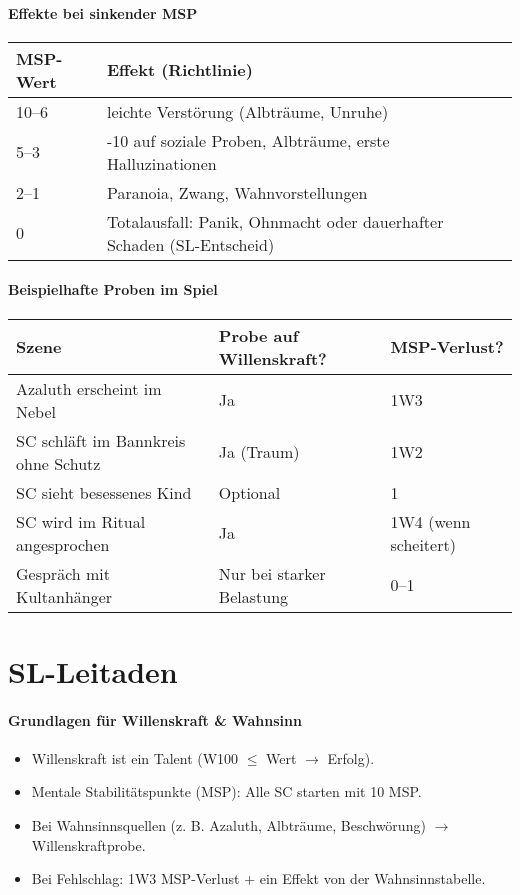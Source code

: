 \paragraph{Effekte bei sinkender MSP}
\begin{center}
\begin{tabular}{ll}
\toprule
\textbf{MSP-Wert} & \textbf{Effekt (Richtlinie)}\\
\midrule 
10–6 & leichte Verstörung (Albträume, Unruhe)\\
\midrule 
5–3 & -10 auf soziale Proben, Albträume, erste Halluzinationen\\
\midrule 
2–1 & Paranoia, Zwang, Wahnvorstellungen\\
\midrule 
0 & Totalausfall: Panik, Ohnmacht oder dauerhafter Schaden (SL-Entscheid)\\
\bottomrule
\end{tabular} 
\end{center}

\paragraph{Beispielhafte Proben im Spiel}
\begin{center}
\begin{tabular}{lll}
\toprule
\textbf{Szene} & \textbf{Probe auf Willenskraft?} & \textbf{MSP-Verlust?}\\
\midrule 
Azaluth erscheint im Nebel & Ja & 1W3\\
\midrule 
SC schläft im Bannkreis ohne Schutz & Ja (Traum) & 1W2\\
\midrule 
SC sieht besessenes Kind & Optional & 1\\
\midrule 
SC wird im Ritual angesprochen & Ja & 1W4 (wenn scheitert)\\
\midrule 
Gespräch mit Kultanhänger & Nur bei starker Belastung & 0–1\\
\bottomrule
\end{tabular} 
\end{center}

\newpage
\section{SL-Leitaden}
\paragraph{Grundlagen für Willenskraft \& Wahnsinn}
\begin{itemize}
\item Willenskraft ist ein Talent (W100 $\leq$ Wert $\rightarrow$ Erfolg).
\item Mentale Stabilitätspunkte (MSP): Alle SC starten mit 10 MSP.
\item Bei Wahnsinnsquellen (z. B. Azaluth, Albträume, Beschwörung) $\rightarrow$ Willenskraftprobe.
\item Bei Fehlschlag: 1W3 MSP-Verlust + ein Effekt von der Wahnsinnstabelle.
\end{itemize}


